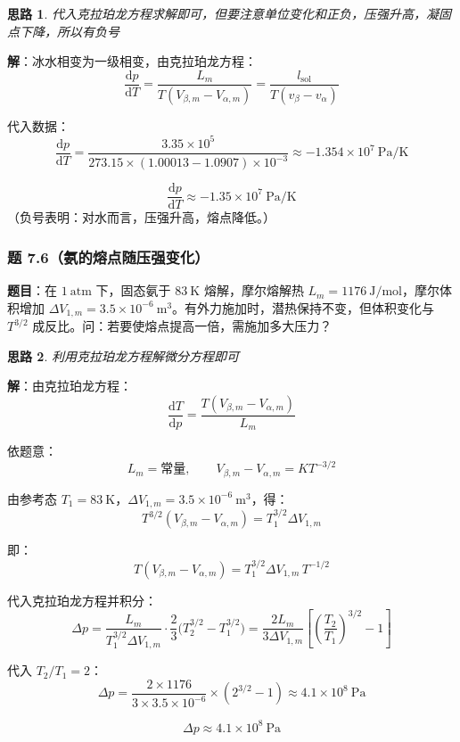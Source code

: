 \documentclass[UTF8]{ctexart}
\newtheorem{thoughts}{思路}[subsection]
\begin{document}
\begin{thoughts}
  代入克拉珀龙方程求解即可，但要注意单位变化和正负，压强升高，凝固点下降，所以有负号
\end{thoughts}

\textbf{解}：冰水相变为一级相变，由克拉珀龙方程：
\[
\frac{\mathrm{d}p}{\mathrm{d}T}
=\frac{L_m}{T(V_{\beta,m}-V_{\alpha,m})}
=\frac{l_{\mathrm{sol}}}{T(v_\beta-v_\alpha)}
\]

代入数据：
\[
\frac{\mathrm{d}p}{\mathrm{d}T}
=\frac{3.35\times 10^5}{273.15\times(1.00013-1.0907)\times 10^{-3}}
\approx -1.354\times 10^7\ \mathrm{Pa/K}
\]

\[
\boxed{\frac{\mathrm{d}p}{\mathrm{d}T}\approx -1.35\times 10^7\ \mathrm{Pa/K}}
\]
（负号表明：对水而言，压强升高，熔点降低。）

\subsubsection{题 7.6（氨的熔点随压强变化）}

\textbf{题目}：在 $1\ \mathrm{atm}$ 下，固态氨于 $83\ \mathrm{K}$ 熔解，摩尔熔解热 $L_m=1176\ \mathrm{J/mol}$，摩尔体积增加 $\Delta V_{1,m}=3.5\times 10^{-6}\ \mathrm{m^3}$。有外力施加时，潜热保持不变，但体积变化与 $T^{3/2}$ 成反比。问：若要使熔点提高一倍，需施加多大压力？

\begin{thoughts}
  利用克拉珀龙方程解微分方程即可
\end{thoughts}

\textbf{解}：由克拉珀龙方程：
\[
\frac{\mathrm{d}T}{\mathrm{d}p}
=\frac{T(V_{\beta,m}-V_{\alpha,m})}{L_m}
\]

依题意：
\[
L_m=\text{常量},\qquad
V_{\beta,m}-V_{\alpha,m}=KT^{-3/2}
\]

由参考态 $T_1=83\ \mathrm{K}$，$\Delta V_{1,m}=3.5\times 10^{-6}\ \mathrm{m^3}$，得：
\[
T^{3/2}(V_{\beta,m}-V_{\alpha,m})=T_1^{3/2}\Delta V_{1,m}
\]

即：
\[
T(V_{\beta,m}-V_{\alpha,m})=T_1^{3/2}\Delta V_{1,m}\,T^{-1/2}
\]

代入克拉珀龙方程并积分：
\[
\Delta p=\frac{L_m}{T_1^{3/2}\Delta V_{1,m}}
\cdot\frac{2}{3}\bigl(T_2^{3/2}-T_1^{3/2}\bigr)
=\frac{2L_m}{3\Delta V_{1,m}}
\left[\left(\frac{T_2}{T_1}\right)^{3/2}-1\right]
\]

代入 $T_2/T_1=2$：
\[
\Delta p=\frac{2\times 1176}{3\times 3.5\times 10^{-6}}\times(2^{3/2}-1)
\approx 4.1\times 10^8\ \mathrm{Pa}
\]

\[
\boxed{\Delta p\approx 4.1\times 10^8\ \mathrm{Pa}}
\]
\end{document}
